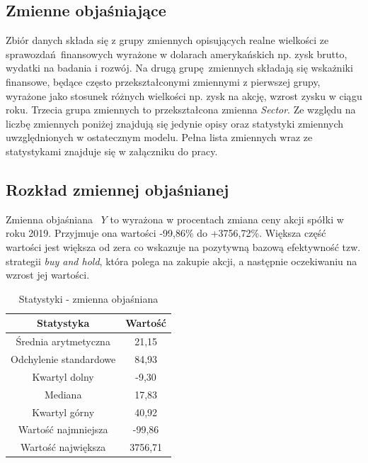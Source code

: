 \documentclass{article}
\begin{document}
\subsection{Zmienne objaśniające}
Zbiór danych składa się z grupy zmiennych opisujących realne wielkości ze sprawozdań finansowych wyrażone w dolarach amerykańskich np. zysk brutto, wydatki na badania i rozwój. Na drugą grupę zmiennych składają się wskażniki finansowe, będące często przekształconymi zmiennymi z pierwszej grupy, wyrażone jako stosunek różnych wielkości np. zysk na akcję, wzrost zysku w ciągu roku. Trzecia grupa zmiennych to przekształcona zmienna \textit{Sector}. Ze względu na liczbę zmiennych poniżej znajdują się jedynie opisy oraz statystyki zmiennych uwzględnionych w ostatecznym modelu. Pełna lista zmiennych wraz ze statystykami znajduje się w załączniku do pracy.

\newpage
\subsection{Rozkład zmiennej objaśnianej}
Zmienna objaśniana ~$Y$ to wyrażona w procentach zmiana ceny akcji spółki w roku 2019. Przyjmuje ona wartości -99,86\% do +3756,72\%. Większa część wartości jest większa od zera co wskazuje na pozytywną bazową efektywność tzw. strategii \textit{buy and hold}, która polega na zakupie akcji, a następnie oczekiwaniu na wzrost jej wartości.

\begin{table}[h!]
    \begin{center}
    \begin{tabular}{|c | c|} 
    \hline
    Statystyka & Wartość \\
    \hline\hline
    Średnia arytmetyczna & 21,15 \\ 
    \hline
    Odchylenie standardowe & 84,93 \\
    \hline
    Kwartyl dolny & -9,30 \\
    \hline
    Mediana & 17,83 \\
    \hline
    Kwartyl górny & 40,92 \\
    \hline
    Wartość najmniejsza & -99,86 \\
    \hline
    Wartość największa & 3756,71 \\
    \hline
   \end{tabular}
    \end{center}
   \caption{Statystyki - zmienna objaśniana}
\end{table}
\end{document}
